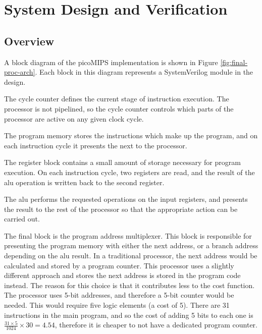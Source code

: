 \section{System Design and Verification} \label{sec:design-verif}

\subsection{Overview} \label{sec:sys-overview}

A block diagram of the picoMIPS implementation is shown in Figure \ref{fig:final-proc-arch}. Each block in this diagram represents a SystemVerilog module in the design.

The cycle counter defines the current stage of instruction execution. The processor is not pipelined, so the cycle counter controls which parts of the processor are active on any given clock cycle.

The program memory stores the instructions which make up the program, and on each instruction cycle it presents the next to the processor.

The register block contains a small amount of storage necessary for program execution. On each instruction cycle, two registers are read, and the result of the \gls{alu} operation is written back to the second register.

The \gls{alu} performs the requested operations on the input registers, and presents the result to the rest of the processor so that the appropriate action can be carried out.

The final block is the program address multiplexer. This block is responsible for presenting the program memory with either the next address, or a branch address depending on the \gls{alu} result. In a traditional processor, the next address would be calculated and stored by a program counter. This processor uses a slightly different approach and stores the next address is stored in the program code instead. The reason for this choice is that it contributes less to the cost function. The processor uses 5-bit addresses, and therefore a 5-bit counter would be needed. This would require five logic elements (a cost of 5). There are 31 instructions in the main program, and so the cost of adding 5 bits to each one is $\frac{31 \times 5}{1024}\times 30 = 4.54$, therefore it is cheaper to not have a dedicated program counter.

